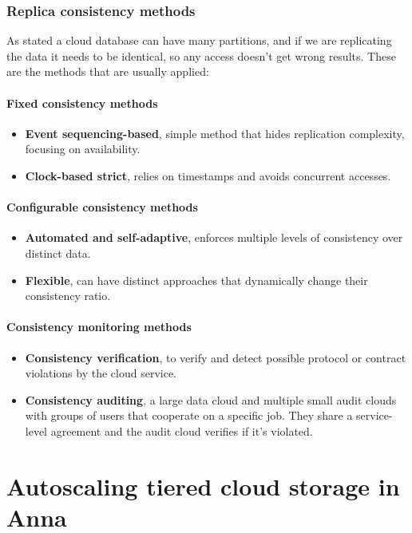 \documentclass[14pt,oneside]{extreport}
\newcommand*\fpar{\hspace{1ex}}
\begin{document}
    \subsection{Replica consistency methods}
    \fpar As stated a cloud database can have many partitions, and if we are replicating the data it needs to be identical, so any access doesn't get wrong results. These are the methods that are usually applied:
      \subsubsection{Fixed consistency methods}
      \begin{itemize}[noitemsep]
        \item \textbf{Event sequencing-based}, simple method that hides replication complexity, focusing on availability.
        \item \textbf{Clock-based strict}, relies on timestamps and avoids concurrent accesses.
      \end{itemize} 
      \subsubsection{Configurable consistency methods}
      \begin{itemize}[noitemsep]
        \item \textbf{Automated and self-adaptive}, enforces multiple levels of consistency over distinct data.
        \item \textbf{Flexible}, can have distinct approaches that dynamically change their consistency ratio.
      \end{itemize} 
      \subsubsection{Consistency monitoring methods}
      \begin{itemize}[noitemsep]
        \item \textbf{Consistency verification}, to verify and detect possible protocol or contract violations by the cloud service.
        \item \textbf{Consistency auditing}, a large data cloud and multiple small audit clouds with groups of users that cooperate on a specific job. They share a service-level agreement and the audit cloud verifies if it's violated.
      \end{itemize} 

\chapter{\Large{Autoscaling tiered cloud storage in Anna \cite{paper2}}}
\end{document}
